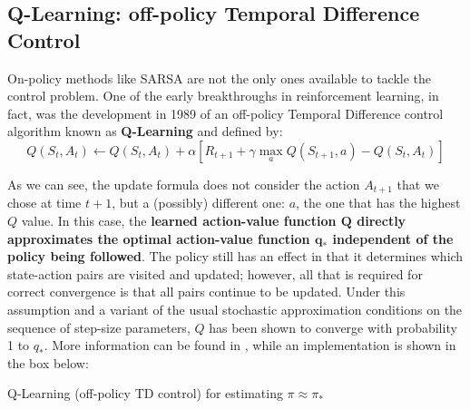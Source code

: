\subsection{Q-Learning: off-policy Temporal Difference Control}
On-policy methods like SARSA are not the only ones available to tackle the control problem. One of the early breakthroughs in reinforcement learning, in fact, was the development in 1989 of an off-policy Temporal Difference control algorithm known as \textbf{Q-Learning} and defined by:
\begin{equation}
    Q(S_t,A_t) \leftarrow Q(S_t,A_t) + \alpha \left[ R_{t+1} + \gamma \max_a Q(S_{t+1},a) - Q(S_t,A_t) \right]
    \label{eq:ch5-qlearningupdaterule}
\end{equation}

As we can see, the update formula does not consider the action $A_{t+1}$ that we chose at time $t+1$, but a (possibly) different one: $a$, the one that has the highest $Q$ value. In this case, the \textbf{learned action-value function $\boldsymbol{Q}$ directly approximates the optimal action-value function $\boldsymbol{q_*}$ independent of the policy being followed}. The policy still has an effect in that it determines which state-action pairs are visited and updated; however, all that is required for correct convergence is that all pairs continue to be updated. Under this assumption and a variant of the usual stochastic approximation conditions on the sequence of step-size parameters, $Q$ has been shown to converge with probability 1 to $q_*$. More information can be found in \cite{Watkins1992}, while an implementation is shown in the box below:

\begin{algorithm}[H]
\SetAlgoLined
\Parameters{step size $\alpha \in \left] 0,1 \right]$, small $\epsilon > 0$}

\caption{Q-Learning (off-policy TD control) for estimating $\pi \approx \pi_*$}
\end{algorithm}

